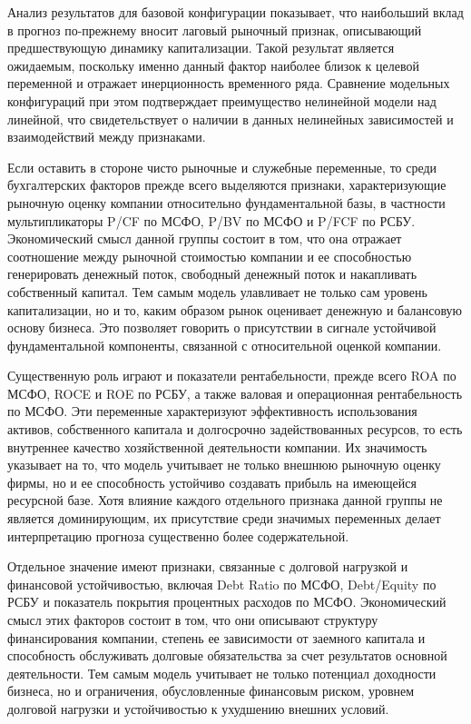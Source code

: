 \documentclass[
]{article}
\begin{document}
Анализ результатов для базовой конфигурации показывает, что наибольший вклад в прогноз по-прежнему вносит лаговый рыночный признак, описывающий предшествующую динамику капитализации. Такой результат является ожидаемым, поскольку именно данный фактор наиболее близок к целевой переменной и отражает инерционность временного ряда. Сравнение модельных конфигураций при этом подтверждает преимущество нелинейной модели над линейной, что свидетельствует о наличии в данных нелинейных зависимостей и взаимодействий между признаками.

Если оставить в стороне чисто рыночные и служебные переменные, то среди бухгалтерских факторов прежде всего выделяются признаки, характеризующие рыночную оценку компании относительно фундаментальной базы, в частности мультипликаторы P/CF по МСФО, P/BV по МСФО и P/FCF по РСБУ. Экономический смысл данной группы состоит в том, что она отражает соотношение между рыночной стоимостью компании и ее способностью генерировать денежный поток, свободный денежный поток и накапливать собственный капитал. Тем самым модель улавливает не только сам уровень капитализации, но и то, каким образом рынок оценивает денежную и балансовую основу бизнеса. Это позволяет говорить о присутствии в сигнале устойчивой фундаментальной компоненты, связанной с относительной оценкой компании.

Существенную роль играют и показатели рентабельности, прежде всего ROA по МСФО, ROCE и ROE по РСБУ, а также валовая и операционная рентабельность по МСФО. Эти переменные характеризуют эффективность использования активов, собственного капитала и долгосрочно задействованных ресурсов, то есть внутреннее качество хозяйственной деятельности компании. Их значимость указывает на то, что модель учитывает не только внешнюю рыночную оценку фирмы, но и ее способность устойчиво создавать прибыль на имеющейся ресурсной базе. Хотя влияние каждого отдельного признака данной группы не является доминирующим, их присутствие среди значимых переменных делает интерпретацию прогноза существенно более содержательной.

Отдельное значение имеют признаки, связанные с долговой нагрузкой и финансовой устойчивостью, включая Debt Ratio по МСФО, Debt/Equity по РСБУ и показатель покрытия процентных расходов по МСФО. Экономический смысл этих факторов состоит в том, что они описывают структуру финансирования компании, степень ее зависимости от заемного капитала и способность обслуживать долговые обязательства за счет результатов основной деятельности. Тем самым модель учитывает не только потенциал доходности бизнеса, но и ограничения, обусловленные финансовым риском, уровнем долговой нагрузки и устойчивостью к ухудшению внешних условий.
\end{document}
